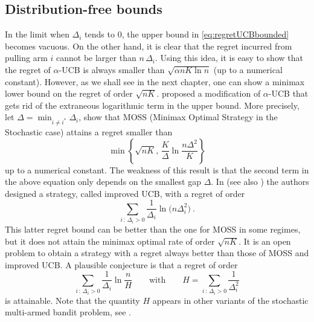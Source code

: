 \documentclass[11pt]{hackednow}
\begin{document}
\subsection{Distribution-free bounds}
In the limit when $\Delta_i$ tends to $0$, the upper bound in \eqref{eq:regretUCBbounded} becomes vacuous. On the other hand, it is clear that the regret incurred from pulling arm $i$ cannot be larger than $n\,\Delta_i$. Using this idea, it is easy to show that the regret of $\alpha$-UCB is always smaller than $\sqrt{\alpha n K \ln n}$ (up to a numerical constant). However, as we shall see in the next chapter, one can show a minimax lower bound on the regret of order $\sqrt{n K}$. \cite{AB09} proposed a modification of $\alpha$-UCB that gets rid of the extraneous logarithmic term in the upper bound. More precisely, let $\Delta = \min_{i \neq i^*} \Delta_i$, \cite{AB10} show that MOSS (Minimax Optimal Strategy in the Stochastic case) attains a regret smaller than 
$$\min \left\{ \sqrt{n K},\, \frac{K}{\Delta} \ln\frac{n \Delta^2}{K} \right\}$$
up to a numerical constant. The weakness of this result is that the second term in the above equation only depends on the smallest gap $\Delta$. In \cite{AO10} (see also \cite{PR11}) the authors designed a strategy, called improved UCB, with a regret of order
$$\sum_{i \,:\, \Delta_i > 0} \frac{1}{\Delta_i} \ln \bigl(n \Delta_i^2\bigr)~.$$
This latter regret bound can be better than the one for MOSS in some regimes, but it does not attain the minimax optimal rate of order $\sqrt{n K}$. It is an open problem to obtain a strategy with a regret always better than those of MOSS and improved UCB. A plausible conjecture is that a regret of order
\[
    \sum_{i \,:\, \Delta_i > 0} \frac{1}{\Delta_i} \ln \frac{n}{H}
\qquad\text{with}\qquad
    H = \sum_{i \,:\, \Delta_i > 0} \frac{1}{\Delta_i^2} 
\]
is attainable. Note that the quantity $H$ appears in other variants of the stochastic multi-armed bandit problem, see \cite{ABM10}.
\end{document}
